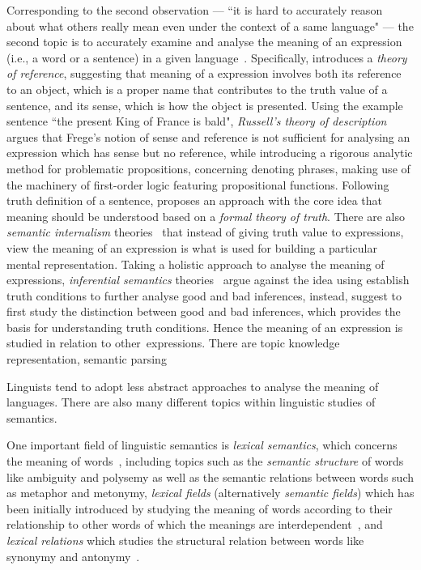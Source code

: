 Corresponding to the second observation --- ``it is hard to accurately reason about what others really mean even under the context of a same language" --- the second topic is to accurately examine and analyse the meaning of an expression (i.e., a word or a sentence) in a given language~\citep{lewis1970}. Specifically, \citet{frege1892} introduces a \emph{theory of reference}, suggesting that meaning of a expression involves both its reference to an object, which is a proper name that contributes to the truth value of a sentence, and its sense, which is how the object is presented. Using the example sentence ``the present King of France is bald", \emph{Russell's theory of description}~\citep{russell1904} argues that Frege's notion of sense and reference is not sufficient for analysing an expression which has sense but no reference, while introducing a rigorous analytic method for problematic propositions, concerning denoting phrases, making use of the machinery of first-order logic featuring propositional functions. Following  truth definition of a sentence, \citet{davidson1967} proposes an approach with the core idea that meaning should be understood based on a \emph{formal theory of truth}. There are also \emph{semantic internalism} theories~\citep{Mcgilvray1998, Chomsky2000, pietroski2017semantic} that instead of giving truth value to expressions, view the meaning of an expression is what is used for building a particular mental representation. Taking a holistic approach to analyse the meaning of expressions, \emph{inferential semantics} theories~\citep{Brandom2000} argue against the idea using establish truth conditions to further analyse good and bad inferences, instead, suggest to first study the distinction between good and bad inferences, which provides the basis for understanding truth conditions. Hence the meaning of an expression is studied in relation to other~expressions. There are topic knowledge representation, semantic parsing

Linguists tend to adopt less abstract approaches to analyse the meaning of languages. There are also many different topics within linguistic studies of semantics.

One important field of linguistic semantics is \emph{lexical semantics}, which concerns the meaning of words~\citep{palmer1981semantics, PUSTEJOVSKY200698, LexicalSemantics}, including topics such as the \emph{semantic structure} of words like ambiguity and polysemy as well as the semantic relations between words such as metaphor and metonymy, \emph{lexical fields} (alternatively \emph{semantic fields}) which has been initially introduced by \citet{trier1931deutsche} studying the meaning of words according to their relationship to other words of which the meanings are interdependent~\citep{palmer1981semantics, jackson2000words}, and \emph{lexical relations} which studies the structural relation between words like synonymy and antonymy~\citep{LexicalSemantics}.

